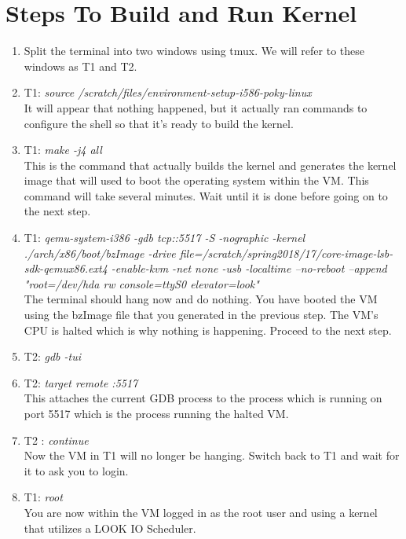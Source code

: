 \documentclass[onecolumn,draftclsnofoot, 10pt, compsoc]{IEEEtran}
\begin{document}
\section{Steps To Build and Run Kernel}
	\begin{enumerate}
		\item
			Split the terminal into two windows using tmux.
			We will refer to these windows as T1 and T2. 
		\item
			T1: \textit{source /scratch/files/environment-setup-i586-poky-linux} \\
			It will appear that nothing happened, but it actually ran commands to configure the shell so that it’s ready to build the kernel. 
		\item
			T1: \textit{make -j4 all} \\
			This is the command that actually builds the kernel and generates the kernel image that will used to boot the operating system within the VM. 
			This command will take several minutes. 
			Wait until it is done before going on to the next step.
		\item
			T1: 
			\textit{qemu-system-i386 -gdb tcp::5517 -S -nographic -kernel ./arch/x86/boot/bzImage -drive file=/scratch/spring2018/17/core-image-lsb-sdk-qemux86.ext4 -enable-kvm -net none -usb -localtime --no-reboot --append "root=/dev/hda rw console=ttyS0 elevator=look"} \\
			The terminal should hang now and do nothing. 
			You have booted the VM using the bzImage file that you generated in the previous step. 
			The VM’s CPU is halted which is why nothing is happening. 
			Proceed to the next step.	
		\item
			T2: \textit{gdb -tui}
		\item
			T2: \textit{target remote :5517} \\
			This attaches the current GDB process to the process which is running on port 5517 which is the process running the halted VM.
		\item
			T2 : \textit{continue} \\
			Now the VM in T1 will no longer be hanging. 
			Switch back to T1 and wait for it to ask you to login.
		\item
			T1: \textit{root} \\
			You are now within the VM logged in as the root user and using a kernel that utilizes a LOOK IO Scheduler. 
	\end{enumerate}

\clearpage
\end{document}
